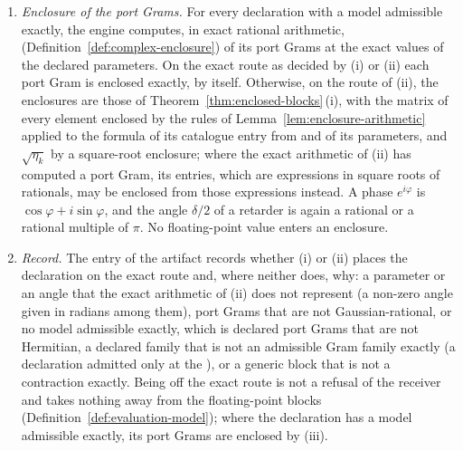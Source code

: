 \begin{requirement}
\begin{enumerate}[label=(\roman*),leftmargin=2.4em]
  entry whose angles are given as coefficients of $\pi$, whose axis angles
  are multiples of $\pi/8$, whose retardances are multiples of $\pi/2$ and
  whose rotations and phases are multiples of $\pi/4$. A declaration whose
  parameters the arithmetic does not represent, a non-zero angle given in
  radians among them, is treated as off the exact route, with its cause
  recorded by (iv), even where its port Grams happen to have entries in
  $\mathbb{Q}(i)$ (two half-wave plates in sequence at one such angle, for
  instance, compose to $-\id$).
\item \emph{Enclosure of the port Grams.} For every declaration with a
  model admissible exactly, the engine computes, in exact rational
  arithmetic, 
  (Definition~\ref{def:complex-enclosure}) of its port Grams at the exact
  values of the declared parameters. On the exact route as decided by (i)
  or (ii) each port Gram is enclosed exactly, by itself. Otherwise, on the
  route of (ii), the
  enclosures are those of Theorem~\ref{thm:enclosed-blocks}\,(i), with the
  matrix of every element enclosed by the rules of
  Lemma~\ref{lem:enclosure-arithmetic} applied to the formula of its
  catalogue entry from 
  and  of its parameters, and
  $\sqrt{\eta_k}$ by a square-root enclosure; where the exact arithmetic of
  (ii) has computed a port Gram, its entries, which are expressions in square
  roots of rationals, may be enclosed from those expressions instead. A
  phase $e^{i\varphi}$ is $\cos\varphi+i\sin\varphi$, and the angle $\delta/2$
  of a retarder is again a rational or a rational multiple of $\pi$. No
  floating-point value enters an enclosure.
\item \emph{Record.} The  entry of the artifact records
  whether (i) or (ii) places the declaration on the exact route and, where
  neither does, why:
  a parameter or an angle that the exact arithmetic of (ii) does not
  represent (a non-zero angle given in radians among them), port Grams that
  are not Gaussian-rational, or no model admissible exactly, which is
  declared port Grams that are not Hermitian, a declared family that is not
  an admissible Gram family exactly (a declaration admitted only at the
  ), or a generic block that is not a contraction
  exactly. Being off the exact route is not a refusal of the receiver and
  takes nothing away from the floating-point blocks (Definition~\ref{def:evaluation-model});
  where the declaration has a model admissible exactly, its port Grams are
  enclosed by (iii).
\end{enumerate}
\end{requirement}
